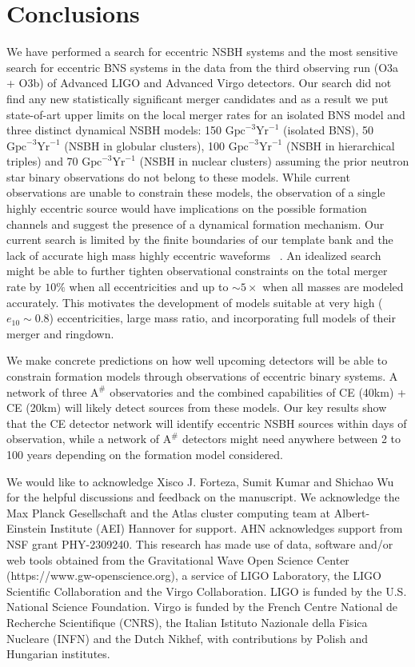 \documentclass[floatfix,lengthcheck,showpacs,amssymb,amsmath,amsfonts,twocolumn,nofootinbib,longbibliography]{revtex4-1}
\begin{document}
\section{Conclusions}
We have performed a search for eccentric NSBH systems and the most sensitive search for eccentric BNS systems in the data from the third observing run (O3a + O3b) of Advanced LIGO and Advanced Virgo detectors. Our search did not find any new statistically significant merger candidates and as a result we put state-of-art upper limits on the local merger rates for an isolated BNS model and three distinct dynamical NSBH models:  150 $\text{Gpc}^{-3}\text{Yr}^{-1}$ (isolated BNS), 50 $\text{Gpc}^{-3}\text{Yr}^{-1}$ (NSBH in globular clusters), 100 $\text{Gpc}^{-3}\text{Yr}^{-1}$ (NSBH in hierarchical triples) and 70 $\text{Gpc}^{-3}\text{Yr}^{-1}$ (NSBH in nuclear clusters) assuming the prior neutron star binary observations do not belong to these models. While current observations are unable to constrain these models, the observation of a single highly eccentric source would have implications on the possible formation channels and suggest the presence of a dynamical formation mechanism. Our current search is limited by the finite boundaries of our template bank and the lack of accurate high mass highly eccentric waveforms ~\cite{Nagar:2021gss,Ramos-Buades:2021adz}. 
An idealized search might be able to further tighten observational constraints on the total merger rate by $10 \%$ when all eccentricities and up to $\sim 5\times$ when all masses are modeled accurately. This motivates the development of models suitable at very high ($e_{10} \sim 0.8$) eccentricities, large mass ratio, and incorporating full models of their merger and ringdown. 

We make concrete predictions on how well upcoming detectors will be able to constrain formation models through observations of eccentric binary systems. A network of three $\text{A}^{\#}$ observatories and the combined capabilities of CE (40km) + CE (20km) will likely detect sources from these models. Our key results show that the CE detector network will identify eccentric NSBH sources within days of observation, while a network of $\text{A}^{\#}$ detectors might need anywhere between 2 to 100 years depending on the formation model considered.


\acknowledgments 
We would like to acknowledge Xisco J. Forteza, Sumit Kumar and Shichao Wu for the helpful discussions and feedback on the manuscript. We acknowledge the Max Planck Gesellschaft and the Atlas cluster computing team at Albert-Einstein Institute (AEI) Hannover for support. AHN acknowledges support from NSF grant PHY-2309240. This research has made use of data, software and/or web tools obtained from the Gravitational Wave Open Science Center (https://www.gw-openscience.org), a service of LIGO Laboratory, the LIGO Scientific Collaboration and the Virgo Collaboration. LIGO is funded by the U.S. National Science Foundation. Virgo is funded by the French Centre National de Recherche Scientifique (CNRS), the Italian Istituto Nazionale della Fisica Nucleare (INFN) and the Dutch Nikhef, with contributions by Polish and Hungarian institutes.

\clearpage

\end{document}
